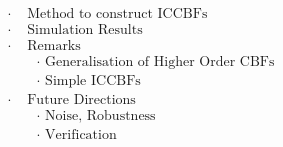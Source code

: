 \documentclass[preview]{standalone}
\begin{document}
\begin{align*}
\cdot & \text{ Method to construct ICCBFs}\\ \cdot &\text{ Simulation Results}\\ \cdot &\text{ Remarks}\\ &\quad \cdot \text{ Generalisation of Higher Order CBFs}\\ &\quad \cdot \text{ Simple ICCBFs}\\ \cdot & \text{ Future Directions}\\ &\quad \cdot \text{ Noise, Robustness}\\ &\quad \cdot \text{ Verification}\\
\end{align*}
\end{document}
